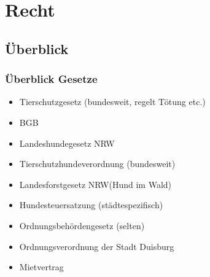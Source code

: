 \chapter{Recht}


\section{Überblick}

    \subsection{Überblick Gesetze}
    \begin{itemize}
        \item Tierschutzgesetz (bundesweit, regelt Tötung etc.)
        \item BGB
        \item Landeshundegesetz NRW
        \item Tierschutzhundeverordnung (bundesweit)
        \item Landesforstgesetz NRW(Hund im Wald)
        \item Hundesteuersatzung (städtespezifisch)
        \item Ordnungsbehördengesetz (selten)
        \item Ordnungsverordnung der Stadt Duisburg
        \item Mietvertrag
    \end{itemize}

